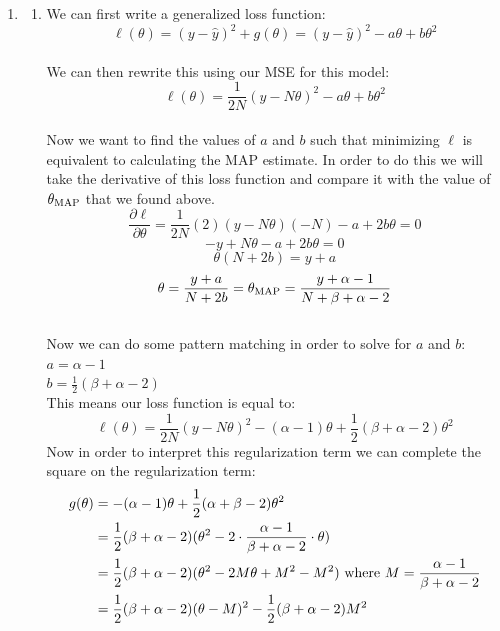 \documentclass[submit]{harvardml}
\begin{document}
\begin{enumerate}
\begin{enumerate}
        \end{enumerate}
        \item
        \begin{enumerate}
            \item 
            We can first write a generalized loss function:\\
            $$\ell(\theta)=(y-\hat{y})^2+g(\theta) = (y-\hat{y})^2-a\theta+b\theta^2$$\\
            We can then rewrite this using our MSE for this model:\\
            $$\ell(\theta) = \frac{1}{2N}(y-N\theta)^2-a\theta+b\theta^2$$\\
            Now we want to find the values of $a$ and $b$ such that minimizing $\ell$ is equivalent to calculating the MAP estimate. In order to do this we will take the derivative of this loss function and compare it with the value of $\theta_{\textnormal{MAP}}$ that we found above.\\
            $$\frac{\partial \ell}{\partial \theta} = \frac{1}{2N}(2)(y-N\theta)(-N)  - a +2b\theta = 0$$
            $$-y + N\theta - a + 2b\theta = 0$$
            $$\theta(N+2b) = y + a$$
            $$\theta = \frac{y+a}{N+2b} = \theta_{\textnormal{MAP}} = \frac{y+\alpha-1}{N+\beta + \alpha-2}$$\\
            Now we can do some pattern matching in order to solve for $a$ and $b$:\\
            $a = \alpha -1$\\
            $b = \frac{1}{2}(\beta + \alpha -2)$\\
            This means our loss function is equal to:\\
            $$\boxed{\ell(\theta) = \frac{1}{2N}(y-N\theta)^2-(\alpha-1)\theta + \frac{1}{2}(\beta+\alpha -2)\theta^2}$$
            Now in order to interpret this regularization term we can complete the square on the regularization term:\\
            \begin{align*}
                g(\theta) &= -(\alpha - 1)\theta + \frac{1}{2}(\alpha + \beta -2)\theta^2\\
                &= \frac{1}{2}(\beta+\alpha-2)(\theta^2-2\cdot\frac{\alpha-1}{\beta+\alpha-2}\cdot \theta)\\
                &=\frac{1}{2}(\beta+\alpha-2)(\theta^2 - 2M\theta + M^2 -M^2) \textnormal{ where } M = \frac{\alpha-1}{\beta+\alpha-2}\\
                &=\frac{1}{2}(\beta+\alpha-2)(\theta-M)^2-\frac{1}{2}(\beta+\alpha-2)M^2

\end{align*}
\end{enumerate}
\end{enumerate}
\end{document}
